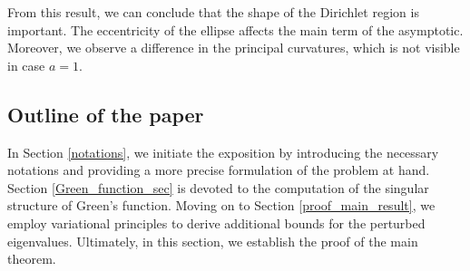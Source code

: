 \documentclass[12pt,a4paper]{amsart}
\numberwithin{equation}{section}
\theoremstyle{plain}
\theoremstyle{definition}
\begin{document}
	From this result, we can conclude that the shape of the Dirichlet region is important. The eccentricity of the ellipse affects the main term of the asymptotic. Moreover, we observe a difference in the principal curvatures, which is not visible in case $a=1$. 
	
	\subsection{Outline of the paper} In Section \ref{notations}, we initiate the exposition by introducing the necessary notations and providing a more precise formulation of the problem at hand. Section \ref{Green_function_sec} is devoted to the computation of the singular structure of Green's function. Moving on to Section \ref{proof_main_result}, we employ variational principles to derive additional bounds for the perturbed eigenvalues. Ultimately, in this section, we establish the proof of the main theorem.
	
	
	
	
	
\end{document}
